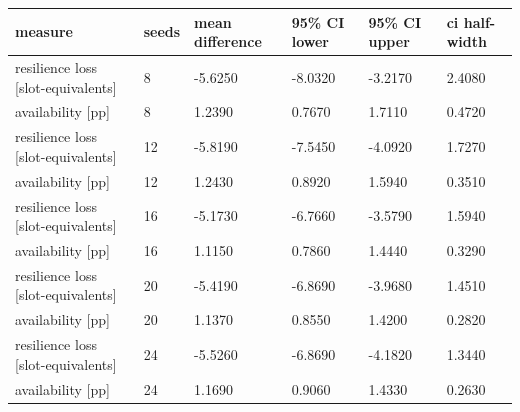 \begin{tabular}{llllll}
\toprule
measure & seeds & mean difference & 95\% CI lower & 95\% CI upper & ci half-width \\
\midrule
resilience loss [slot-equivalents] & 8 & -5.6250 & -8.0320 & -3.2170 & 2.4080 \\
availability [pp] & 8 & 1.2390 & 0.7670 & 1.7110 & 0.4720 \\
resilience loss [slot-equivalents] & 12 & -5.8190 & -7.5450 & -4.0920 & 1.7270 \\
availability [pp] & 12 & 1.2430 & 0.8920 & 1.5940 & 0.3510 \\
resilience loss [slot-equivalents] & 16 & -5.1730 & -6.7660 & -3.5790 & 1.5940 \\
availability [pp] & 16 & 1.1150 & 0.7860 & 1.4440 & 0.3290 \\
resilience loss [slot-equivalents] & 20 & -5.4190 & -6.8690 & -3.9680 & 1.4510 \\
availability [pp] & 20 & 1.1370 & 0.8550 & 1.4200 & 0.2820 \\
resilience loss [slot-equivalents] & 24 & -5.5260 & -6.8690 & -4.1820 & 1.3440 \\
availability [pp] & 24 & 1.1690 & 0.9060 & 1.4330 & 0.2630 \\
\bottomrule
\end{tabular}
